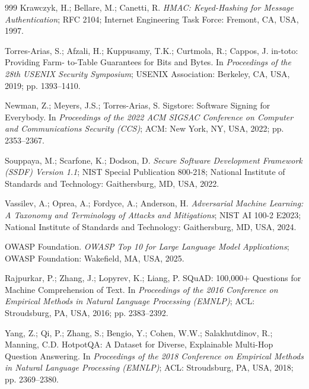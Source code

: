\begin{thebibliography}{999}
Krawczyk, H.; Bellare, M.; Canetti, R. \textit{HMAC: Keyed-Hashing for Message Authentication};
RFC 2104; Internet Engineering Task Force: Fremont, CA, USA, 1997.

Torres-Arias, S.; Afzali, H.; Kuppusamy, T.K.; Curtmola, R.; Cappos, J. in-toto: Providing Farm-
to-Table Guarantees for Bits and Bytes. In \textit{Proceedings of the 28th USENIX Security
Symposium}; USENIX Association: Berkeley, CA, USA, 2019; pp. 1393--1410.

Newman, Z.; Meyers, J.S.; Torres-Arias, S. Sigstore: Software Signing for Everybody. In
\textit{Proceedings of the 2022 ACM SIGSAC Conference on Computer and Communications Security
(CCS)}; ACM: New York, NY, USA, 2022; pp. 2353--2367.

Souppaya, M.; Scarfone, K.; Dodson, D. \textit{Secure Software Development Framework (SSDF)
Version 1.1}; NIST Special Publication 800-218; National Institute of Standards and Technology:
Gaithersburg, MD, USA, 2022.

Vassilev, A.; Oprea, A.; Fordyce, A.; Anderson, H. \textit{Adversarial Machine Learning: A
Taxonomy and Terminology of Attacks and Mitigations}; NIST AI 100-2 E2023; National Institute
of Standards and Technology: Gaithersburg, MD, USA, 2024.

OWASP Foundation. \textit{OWASP Top 10 for Large Language Model Applications}; OWASP
Foundation: Wakefield, MA, USA, 2025.


Rajpurkar, P.; Zhang, J.; Lopyrev, K.; Liang, P. SQuAD: 100,000+ Questions for Machine
Comprehension of Text. In \textit{Proceedings of the 2016 Conference on Empirical Methods in
Natural Language Processing (EMNLP)}; ACL: Stroudsburg, PA, USA, 2016; pp. 2383--2392.

Yang, Z.; Qi, P.; Zhang, S.; Bengio, Y.; Cohen, W.W.; Salakhutdinov, R.; Manning, C.D. HotpotQA:
A Dataset for Diverse, Explainable Multi-Hop Question Answering. In \textit{Proceedings of the
2018 Conference on Empirical Methods in Natural Language Processing (EMNLP)}; ACL: Stroudsburg,
PA, USA, 2018; pp. 2369--2380.


\end{thebibliography}
